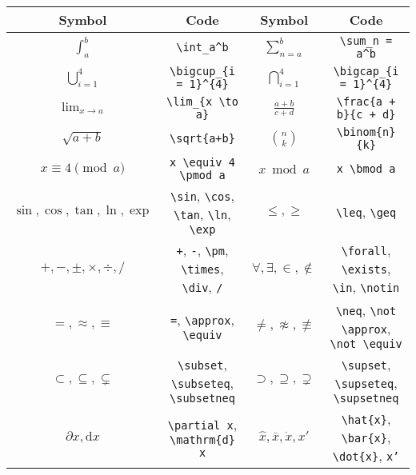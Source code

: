 \documentclass{article}
\newcommand*{\code}[1]{\texttt{#1}}
\begin{document}
\begin{table}[htb]
  \centering
  \begin{tabular}[htb]{c c c c}
  \toprule
  Symbol & Code & Symbol & Code \\ \midrule
  $\displaystyle\int_{a}^{b}$ & \code{\textbackslash{}int\_{a}\textasciicircum{}{b}} & $\displaystyle\sum_{n = a}^{b}$ & \code{\textbackslash{}sum\_{n = a}\textasciicircum{}{b}} \\
  $\displaystyle \bigcup_{i = 1}^{4}$ & \code{\textbackslash{}bigcup\_\{i = 1\}\textasciicircum{}\{4\}} & $\displaystyle \bigcap_{i = 1}^{4}$ & \code{\textbackslash{}bigcap\_\{i = 1\}\textasciicircum{}\{4\}}\\
  $\displaystyle\lim_{x \to a}$ & \code{\textbackslash{}lim\_\{x \textbackslash{}to a\}} & $\displaystyle\frac{a + b}{c + d}$ & \code{\textbackslash{}frac\{a + b\}\{c + d\}} \\
  $\displaystyle \sqrt{a + b}$ & \code{\textbackslash{}sqrt\{a+b\}} & $\displaystyle \binom{n}{k}$ & \code{\textbackslash{}binom\{n\}\{k\}}\\
  $x \equiv 4 \pmod a$ & \code{x \textbackslash{}equiv 4 \textbackslash{}pmod a} & $x \bmod a$ & \code{x \textbackslash{}bmod a} \\
  $\sin, \cos, \tan, \ln, \exp$ & \code{\textbackslash{}sin}, \code{\textbackslash{}cos}, \code{\textbackslash{}tan}, \code{\textbackslash{}ln}, \code{\textbackslash{}exp} & $\leq, \geq$ & \code{\textbackslash{}leq}, \code{\textbackslash{}geq} \\
  $+, -, \pm, \times, \div, /$ & \code{+}, \code{-}, \code{\textbackslash{}pm}, \code{\textbackslash{}times}, \code{\textbackslash{}div}, \code{/} & $\forall, \exists, \in, \notin$ & \code{\textbackslash{}forall}, \code{\textbackslash{}exists}, \code{\textbackslash{}in}, \code{\textbackslash{}notin} \\
  $=, \approx, \equiv$ & \code{=}, \code{\textbackslash{}approx}, \code{\textbackslash{}equiv} & $\neq, \not \approx, \not \equiv$ & \code{\textbackslash{}neq}, \code{\textbackslash{}not \textbackslash{}approx}, \code{\textbackslash{}not \textbackslash{}equiv} \\
  $\subset, \subseteq, \subsetneq$ & \code{\textbackslash{}subset}, \code{\textbackslash{}subseteq}, \code{\textbackslash{}subsetneq} & $\supset, \supseteq, \supsetneq$ & \code{\textbackslash{}supset}, \code{\textbackslash{}supseteq}, \code{\textbackslash{}supsetneq} \\
  $\partial x, \mathrm{d} x$ & \code{\textbackslash{}partial x}, \code{\textbackslash{}mathrm\{d\} x} & $\hat{x}, \bar{x}, \dot{x}, x'$ & \code{\textbackslash{}hat\{x\}}, \code{\textbackslash{}bar\{x\}}, \code{\textbackslash{}dot\{x\}}, \code{x'} \\

\end{tabular}
\end{table}
\end{document}
